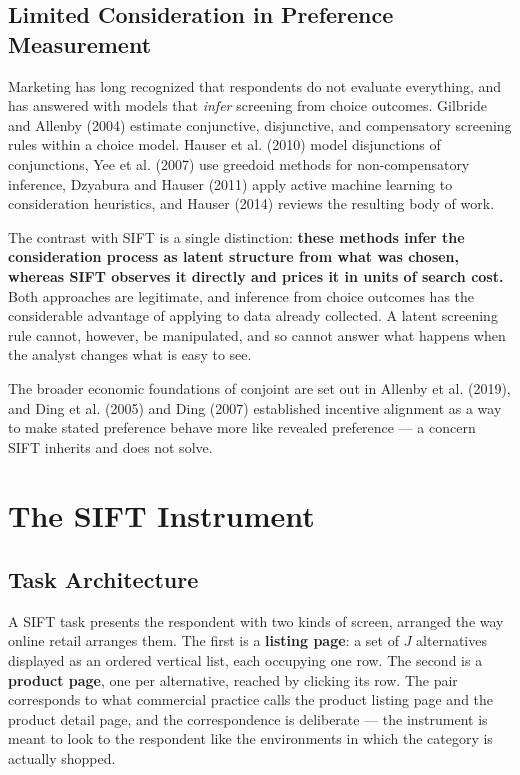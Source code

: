\documentclass[
  letterpaper,
  DIV=11,
  numbers=noendperiod]{scrartcl}
\begin{document}
\subsection{Limited Consideration in Preference
Measurement}\label{sec-lit-consideration}

Marketing has long recognized that respondents do not evaluate
everything, and has answered with models that \emph{infer} screening
from choice outcomes. Gilbride and Allenby (2004) estimate conjunctive,
disjunctive, and compensatory screening rules within a choice model.
Hauser et al. (2010) model disjunctions of conjunctions, Yee et al.
(2007) use greedoid methods for non-compensatory inference, Dzyabura and
Hauser (2011) apply active machine learning to consideration heuristics,
and Hauser (2014) reviews the resulting body of work.

The contrast with SIFT is a single distinction: \textbf{these methods
infer the consideration process as latent structure from what was
chosen, whereas SIFT observes it directly and prices it in units of
search cost.} Both approaches are legitimate, and inference from choice
outcomes has the considerable advantage of applying to data already
collected. A latent screening rule cannot, however, be manipulated, and
so cannot answer what happens when the analyst changes what is easy to
see.

The broader economic foundations of conjoint are set out in Allenby et
al. (2019), and Ding et al. (2005) and Ding (2007) established incentive
alignment as a way to make stated preference behave more like revealed
preference --- a concern SIFT inherits and does not solve.

\section{The SIFT Instrument}\label{sec-instrument}

\subsection{Task Architecture}\label{sec-instrument-architecture}

A SIFT task presents the respondent with two kinds of screen, arranged
the way online retail arranges them. The first is a \textbf{listing
page}: a set of \(J\) alternatives displayed as an ordered vertical
list, each occupying one row. The second is a \textbf{product page}, one
per alternative, reached by clicking its row. The pair corresponds to
what commercial practice calls the product listing page and the product
detail page, and the correspondence is deliberate --- the instrument is
meant to look to the respondent like the environments in which the
category is actually shopped.
\end{document}
